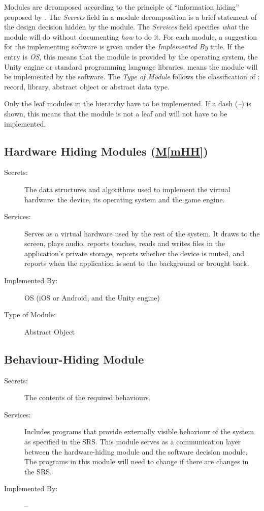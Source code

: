 \documentclass[12pt, titlepage]{article}
\newcommand{\mref}[1]{\hyperref[#1]{M\ref*{#1}}}
\begin{document}
Modules are decomposed according to the principle of ``information hiding''
proposed by \citet{ParnasEtAl1984}. The \emph{Secrets} field in a module
decomposition is a brief statement of the design decision hidden by the
module. The \emph{Services} field specifies \emph{what} the module will do
without documenting \emph{how} to do it. For each module, a suggestion for the
implementing software is given under the \emph{Implemented By} title. If the
entry is \emph{OS}, this means that the module is provided by the operating
system, the Unity engine or standard programming language libraries.
\emph{\progname{}} means the module will be implemented by the \progname{}
software. The \emph{Type of Module} follows the classification of
\citet{GhezziEtAl2003}: record, library, abstract object or abstract data type.

Only the leaf modules in the hierarchy have to be implemented. If a dash
(\emph{--}) is shown, this means that the module is not a leaf and will not have
to be implemented.

\subsection{Hardware Hiding Modules (\mref{mHH})}

\begin{description}
\item[Secrets:] The data structures and algorithms used to implement the
  virtual hardware: the device, its operating system and the game engine.
\item[Services:] Serves as a virtual hardware used by the rest of the
  system. It draws to the screen, plays audio, reports touches, reads and writes
  files in the application's private storage, reports whether the device is
  muted, and reports when the application is sent to the background or
  brought back.
\item[Implemented By:] OS (iOS or Android, and the Unity engine)
\item[Type of Module:] Abstract Object
\end{description}

\subsection{Behaviour-Hiding Module}

\begin{description}
\item[Secrets:] The contents of the required behaviours.
\item[Services:] Includes programs that provide externally visible behaviour of
  the system as specified in the SRS. This module serves as a communication
  layer between the hardware-hiding module and the software decision module.
  The programs in this module will need to change if there are changes in the
  SRS.
\item[Implemented By:] --
\end{description}
\end{document}
